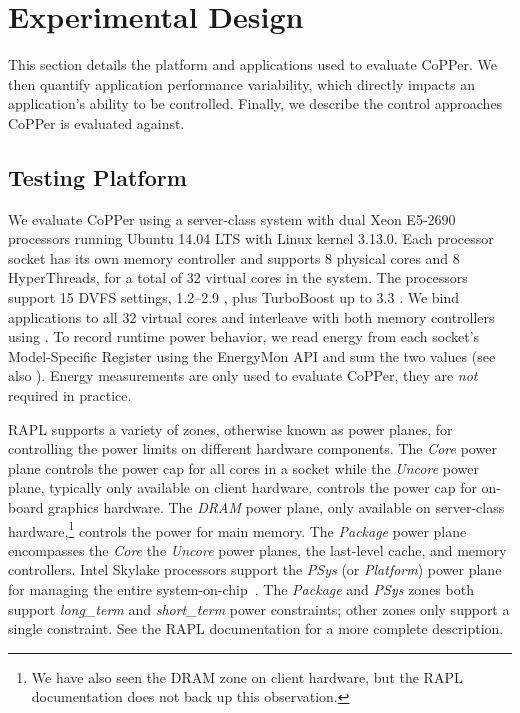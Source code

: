 \section{Experimental Design}
\label{sec:copper-usage}

This section details the platform and applications used to evaluate CoPPer.
We then quantify application performance variability, which directly impacts an application's ability to be controlled.
Finally, we describe the control approaches CoPPer is evaluated against.


\subsection{Testing Platform}

We evaluate CoPPer using a server-class system with dual Xeon E5-2690 processors running Ubuntu 14.04 LTS with Linux kernel 3.13.0.
Each processor socket has its own memory controller and supports 8 physical cores and 8 HyperThreads, for a total of 32 virtual cores in the system.
The processors support 15 DVFS settings, 1.2--2.9 \GHz, plus TurboBoost up to 3.3 \GHz.
We bind applications to all 32 virtual cores and interleave with both memory controllers using .
To record runtime power behavior, we read energy from each socket's Model-Specific Register using the EnergyMon API and sum the two values \cite{energymon,SandyBridge} (see also ).
Energy measurements are only used to evaluate CoPPer, they are \emph{not} required in practice.

RAPL supports a variety of zones, otherwise known as power planes, for controlling the power limits on different hardware components.
The \emph{Core} power plane controls the power cap for all cores in a socket while the \emph{Uncore} power plane, typically only available on client hardware, controls the power cap for on-board graphics hardware.
The \emph{DRAM} power plane, only available on server-class hardware,\footnote{We have also seen the DRAM zone on client hardware, but the RAPL documentation does not back up this observation.} controls the power for main memory.
The \emph{Package} power plane encompasses the \emph{Core} the \emph{Uncore} power planes, the last-level cache, and memory controllers.
Intel Skylake processors support the \emph{PSys} (or \emph{Platform}) power plane for managing the entire system-on-chip~\cite{skylake}.
The \emph{Package} and \emph{PSys} zones both support \emph{long\_term} and \emph{short\_term} power constraints; other zones only support a single constraint.
See the RAPL documentation for a more complete description.

